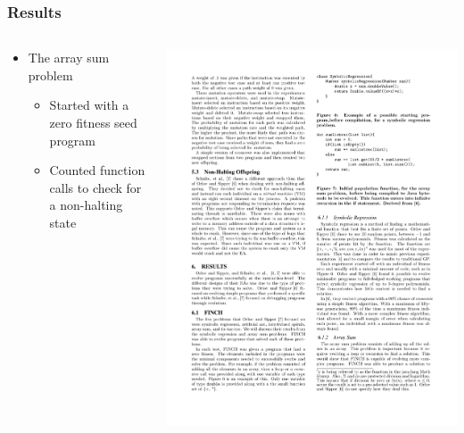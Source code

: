 \documentclass{beamer}
\begin{document}
\begin{frame}
\frametitle{Results}
\begin{columns}
\begin{column}{0.5\textwidth}
\begin{itemize}
\item The array sum problem
\begin{itemize}
\item Started with a zero fitness seed program
\item Counted function calls to check for a non-halting state
\end{itemize}

\end{itemize}
\end{column}
\begin{column}{0.5\textwidth}
\includegraphics[height=.38\textheight]{Illustrations/seedRec.pdf}
\end{column}
\end{columns}
\end{frame}
\end{document}
